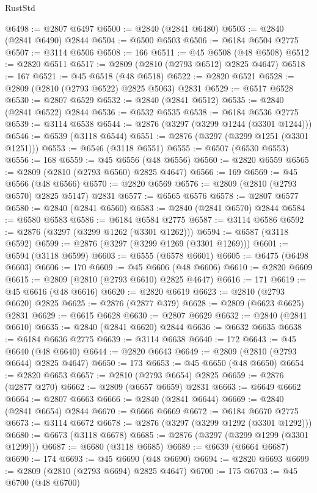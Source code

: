 \begin{lexlean}{RustStd}
\begin{coremodule}
@6498 := @2807 @6497
@6500 := @2840 (@2841 @6480)
@6503 := @2840 (@2841 @6490) @2844
@6504 := @6500 @6503
@6506 := @6184 @6504 @2775
@6507 := @3114 @6506
@6508 := 166
@6511 := @45 @6508 (@48 @6508)
@6512 := @2820 @6511
@6517 := @2809 (@2810 (@2793 @6512) @2825 @4647)
@6518 := 167
@6521 := @45 @6518 (@48 @6518)
@6522 := @2820 @6521
@6528 := @2809 (@2810 (@2793 @6522) @2825 @5063) @2831
@6529 := @6517 @6528
@6530 := @2807 @6529
@6532 := @2840 (@2841 @6512)
@6535 := @2840 (@2841 @6522) @2844
@6536 := @6532 @6535
@6538 := @6184 @6536 @2775
@6539 := @3114 @6538
@6544 := @2876 (@3297 (@3299 @1244 (@3301 @1244)))
@6546 := @6539 (@3118 @6544)
@6551 := @2876 (@3297 (@3299 @1251 (@3301 @1251)))
@6553 := @6546 (@3118 @6551)
@6555 := @6507 (@6530 @6553)
@6556 := 168
@6559 := @45 @6556 (@48 @6556)
@6560 := @2820 @6559
@6565 := @2809 (@2810 (@2793 @6560) @2825 @4647)
@6566 := 169
@6569 := @45 @6566 (@48 @6566)
@6570 := @2820 @6569
@6576 := @2809 (@2810 (@2793 @6570) @2825 @5147) @2831
@6577 := @6565 @6576
@6578 := @2807 @6577
@6580 := @2840 (@2841 @6560)
@6583 := @2840 (@2841 @6570) @2844
@6584 := @6580 @6583
@6586 := @6184 @6584 @2775
@6587 := @3114 @6586
@6592 := @2876 (@3297 (@3299 @1262 (@3301 @1262)))
@6594 := @6587 (@3118 @6592)
@6599 := @2876 (@3297 (@3299 @1269 (@3301 @1269)))
@6601 := @6594 (@3118 @6599)
@6603 := @6555 (@6578 @6601)
@6605 := @6475 (@6498 @6603)
@6606 := 170
@6609 := @45 @6606 (@48 @6606)
@6610 := @2820 @6609
@6615 := @2809 (@2810 (@2793 @6610) @2825 @4647)
@6616 := 171
@6619 := @45 @6616 (@48 @6616)
@6620 := @2820 @6619
@6623 := @2810 (@2793 @6620) @2825
@6625 := @2876 (@2877 @379)
@6628 := @2809 (@6623 @6625) @2831
@6629 := @6615 @6628
@6630 := @2807 @6629
@6632 := @2840 (@2841 @6610)
@6635 := @2840 (@2841 @6620) @2844
@6636 := @6632 @6635
@6638 := @6184 @6636 @2775
@6639 := @3114 @6638
@6640 := 172
@6643 := @45 @6640 (@48 @6640)
@6644 := @2820 @6643
@6649 := @2809 (@2810 (@2793 @6644) @2825 @4647)
@6650 := 173
@6653 := @45 @6650 (@48 @6650)
@6654 := @2820 @6653
@6657 := @2810 (@2793 @6654) @2825
@6659 := @2876 (@2877 @270)
@6662 := @2809 (@6657 @6659) @2831
@6663 := @6649 @6662
@6664 := @2807 @6663
@6666 := @2840 (@2841 @6644)
@6669 := @2840 (@2841 @6654) @2844
@6670 := @6666 @6669
@6672 := @6184 @6670 @2775
@6673 := @3114 @6672
@6678 := @2876 (@3297 (@3299 @1292 (@3301 @1292)))
@6680 := @6673 (@3118 @6678)
@6685 := @2876 (@3297 (@3299 @1299 (@3301 @1299)))
@6687 := @6680 (@3118 @6685)
@6689 := @6639 (@6664 @6687)
@6690 := 174
@6693 := @45 @6690 (@48 @6690)
@6694 := @2820 @6693
@6699 := @2809 (@2810 (@2793 @6694) @2825 @4647)
@6700 := 175
@6703 := @45 @6700 (@48 @6700)

\end{coremodule}
\end{lexlean}
